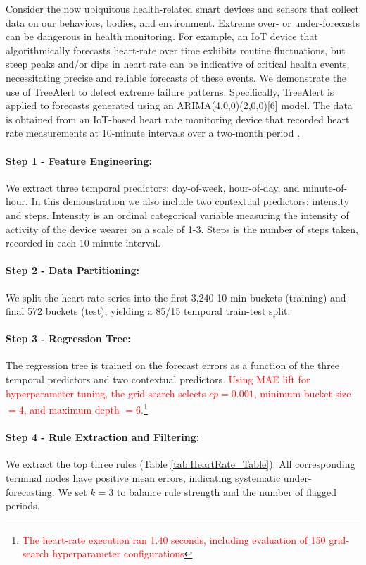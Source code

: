 \documentclass[12pt]{article}
\newcommand{\matt}[1]{\textcolor{red}{#1}}
\begin{document}
Consider the now ubiquitous health-related smart devices and sensors that collect data on our behaviors, bodies, and environment. Extreme over- or under-forecasts can be dangerous in health monitoring. For example, an IoT device that algorithmically forecasts heart-rate over time exhibits routine fluctuations, but steep peaks and/or dips in heart rate can be indicative of critical health events, necessitating precise and reliable forecasts of these events. We demonstrate the use of TreeAlert to detect extreme failure patterns. Specifically, TreeAlert is applied to forecasts  generated using an ARIMA(4,0,0)(2,0,0)[6] model.  The data is obtained from an IoT-based heart rate monitoring device that recorded heart rate measurements at 10-minute intervals over a two-month period \citep{furberg2016}. %

\paragraph{Step 1 - Feature Engineering:}
We extract three temporal predictors: day-of-week, hour-of-day, and minute-of-hour. In this demonstration we also include two contextual predictors: intensity and steps. Intensity is an ordinal categorical variable measuring the intensity of activity of the device wearer on a scale of 1-3. Steps is the number of steps taken, recorded in each 10-minute interval.

\paragraph{Step 2 - Data Partitioning:}
We split the heart rate series into the first 3,240 10-min buckets (training) and final 572 buckets (test), yielding a 85/15 temporal train-test split.

\paragraph{Step 3 - Regression Tree:}
The regression tree is trained on the forecast errors as a function of the three temporal predictors and two contextual predictors. \matt{Using MAE lift for hyperparameter tuning, the grid search selects $cp = 0.001$, minimum bucket size $=4$, and maximum depth $=6$.}\footnote{\matt{The heart-rate execution ran 1.40 seconds, including evaluation of 150 grid-search hyperparameter configurations}}

\paragraph{Step 4 - Rule Extraction and Filtering:}
We extract the top three rules (Table \ref{tab:HeartRate_Table}). All corresponding terminal nodes have positive mean errors, indicating systematic under-forecasting. We set $k=3$ to balance rule strength and the number of flagged periods. %
\end{document}
